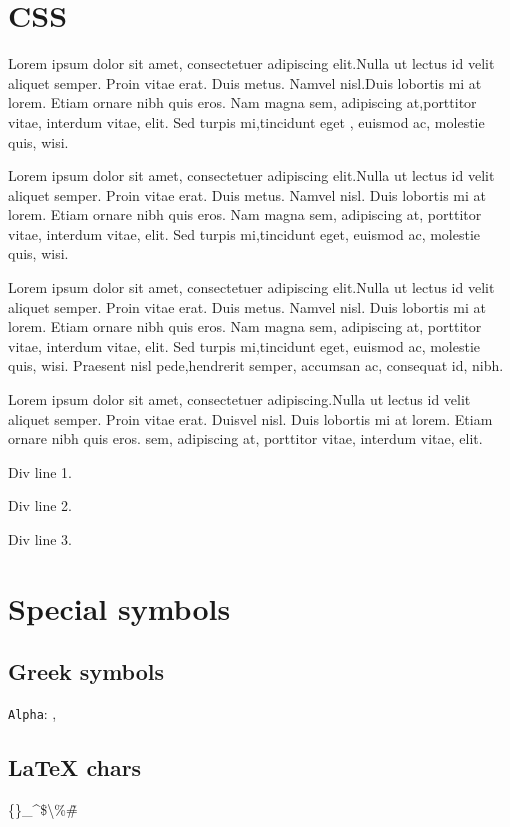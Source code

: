 \documentclass{article}
\begin{document}
\section{CSS}
\par Lorem ipsum dolor sit amet, consectetuer adipiscing elit.Nulla ut lectus id velit aliquet semper. Proin vitae erat. Duis metus. Namvel nisl.Duis lobortis mi at lorem. Etiam ornare nibh quis eros. Nam magna sem, adipiscing at,porttitor vitae, interdum vitae, elit. Sed turpis mi,tincidunt eget , euismod ac, molestie quis, wisi.
\par Lorem ipsum dolor sit amet, consectetuer adipiscing elit.Nulla ut lectus id velit aliquet semper. Proin vitae erat. Duis metus. Namvel nisl. Duis lobortis mi at lorem. Etiam ornare nibh quis eros. Nam magna sem, adipiscing at, porttitor vitae, interdum vitae, elit. Sed turpis mi,tincidunt eget, euismod ac, molestie quis, wisi.
\par Lorem ipsum dolor sit amet, consectetuer adipiscing elit.Nulla ut lectus id velit aliquet semper. Proin vitae erat. Duis metus. Namvel nisl. Duis lobortis mi at lorem. Etiam ornare nibh quis eros. Nam magna sem, adipiscing at, porttitor vitae, interdum vitae, elit. Sed turpis mi,tincidunt eget, euismod ac, molestie quis, wisi. Praesent nisl pede,hendrerit semper, accumsan ac, consequat id, nibh.
\par Lorem ipsum dolor sit amet, consectetuer adipiscing.Nulla ut lectus id velit aliquet semper. Proin vitae erat. Duisvel nisl. Duis lobortis mi at lorem. Etiam ornare nibh quis eros. sem, adipiscing at, porttitor vitae, interdum vitae, elit.
\par 
\par Div line 1. 
\par 
\par Div line 2. 
\par 
\par Div line 3.
\section{Special symbols}
\subsection{Greek symbols}
\par 
\texttt{Alpha}: \Alpha, \Gamma\Theta\Xi\Pi
\subsection{LaTeX chars}
\par \{\}\_\^\@\${\textbackslash}\%\~\#
\end{document}
